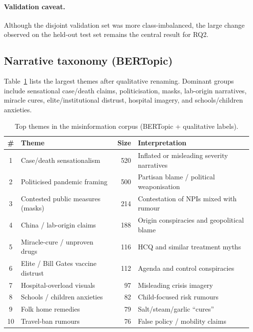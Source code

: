 \documentclass[12pt, a4paper]{report}
\begin{document}
\paragraph{Validation caveat.}
Although the disjoint validation set was more class-imbalanced, the large change observed on the held-out test set remains the central result for RQ2.

\subsection{Narrative taxonomy (BERTopic)}

Table~\ref{tab:taxonomy} lists the largest themes after qualitative renaming.
Dominant groups include sensational case/death claims, politicisation, masks, lab-origin narratives, miracle cures, elite/institutional distrust, hospital imagery, and schools/children anxieties.

\begin{table}[htbp]
\centering
\caption{Top themes in the misinformation corpus (BERTopic + qualitative labels).}
\label{tab:taxonomy}
\small
\begin{tabular}{clrp{5.0cm}}
\hline
\# & Theme & Size & Interpretation \\
\hline
1 & Case/death sensationalism & 520 & Inflated or misleading severity narratives \\
2 & Politicised pandemic framing & 500 & Partisan blame / political weaponisation \\
3 & Contested public measures (masks) & 214 & Contestation of NPIs mixed with rumour \\
4 & China / lab-origin claims & 188 & Origin conspiracies and geopolitical blame \\
5 & Miracle-cure / unproven drugs & 116 & HCQ and similar treatment myths \\
6 & Elite / Bill Gates vaccine distrust & 112 & Agenda and control conspiracies \\
7 & Hospital-overload visuals & 97 & Misleading crisis imagery \\
8 & Schools / children anxieties & 82 & Child-focused risk rumours \\
9 & Folk home remedies & 79 & Salt/steam/garlic ``cures'' \\
10 & Travel-ban rumours & 76 & False policy / mobility claims \\
\hline
\end{tabular}
\end{table}
\end{document}
